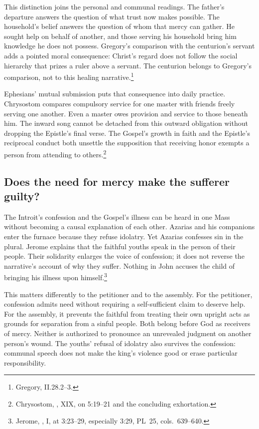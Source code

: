 This distinction joins the personal and communal readings. The father's
departure answers the question of what trust now makes possible. The
household's belief answers the question of whom that mercy can gather.
He sought help on behalf of another, and those serving his household
bring him knowledge he does not possess. Gregory's comparison with the
centurion's servant adds a pointed moral consequence: Christ's regard
does not follow the social hierarchy that prizes a ruler above a
servant. The centurion belongs to Gregory's comparison, not to this
healing narrative.\footnote{Gregory, II.28.2--3.}

Ephesians' mutual submission puts that consequence into daily practice.
Chrysostom compares compulsory service for one master with friends
freely serving one another. Even a master owes provision and service
to those beneath him. The inward song cannot be detached from this
outward obligation without dropping the Epistle's final verse. The
Gospel's growth in faith and the Epistle's reciprocal conduct both
unsettle the supposition that receiving honor exempts a person from
attending to others.\footnote{Chrysostom, ,
XIX, on 5:19--21 and the concluding exhortation.}

\subsection{Does the need for mercy make the sufferer guilty?}
The Introit's confession and the Gospel's illness can be heard in one
Mass without becoming a causal explanation of each other. Azarias and
his companions enter the furnace because they refuse idolatry. Yet
Azarias confesses sin in the plural. Jerome explains that the faithful
youths speak in the person of their people. Their solidarity enlarges
the voice of confession; it does not reverse the narrative's account
of why they suffer. Nothing in John accuses the child of bringing his
illness upon himself.\footnote{Jerome, , I,
at 3:23--29, especially 3:29, PL~25, cols.~639--640.}

This matters differently to the petitioner and to the assembly.
For the petitioner, confession admits need without requiring a
self-sufficient claim to deserve help. For the assembly, it prevents
the faithful from treating their own upright acts as grounds for
separation from a sinful people. Both belong before God as receivers
of mercy. Neither is authorized to pronounce an unrevealed judgment
on another person's wound. The youths' refusal of idolatry also
survives the confession: communal speech does not make the king's
violence good or erase particular responsibility.

